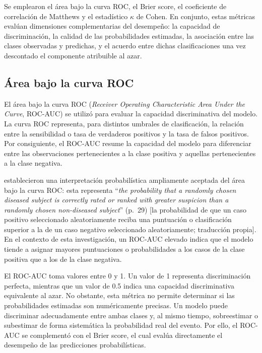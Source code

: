 Se emplearon el área bajo la curva ROC, el Brier score, el coeficiente de
correlación de Matthews y el estadístico $\kappa$ de Cohen. En conjunto, estas
métricas evalúan dimensiones complementarias del desempeño: la capacidad de
discriminación, la calidad de las probabilidades estimadas, la asociación entre las
clases observadas y predichas, y el acuerdo entre dichas clasificaciones una vez
descontado el componente atribuible al azar.

\subsection{Área bajo la curva ROC}

El área bajo la curva ROC (\emph{Receiver Operating Characteristic Area Under the
Curve}, ROC-AUC) se utilizó para evaluar la capacidad discriminativa del modelo. La
curva ROC representa, para distintos umbrales de clasificación, la relación entre
la sensibilidad o tasa de verdaderos positivos y la tasa de falsos positivos. Por
consiguiente, el ROC-AUC resume la capacidad del modelo para diferenciar entre las
observaciones pertenecientes a la clase positiva y aquellas pertenecientes a la
clase negativa.

 establecieron una interpretación probabilística
ampliamente aceptada del área bajo la curva ROC: esta representa ``\emph{the
probability that a randomly chosen diseased subject is correctly rated or ranked
with greater suspicion than a randomly chosen non-diseased subject}'' (p.~29) [la
probabilidad de que un caso positivo seleccionado aleatoriamente reciba una
puntuación o clasificación superior a la de un caso negativo seleccionado
aleatoriamente; traducción propia]. En el contexto de esta investigación, un
ROC-AUC elevado indica que el modelo tiende a asignar mayores puntuaciones o
probabilidades a los casos de la clase positiva que a los de la clase negativa.

El ROC-AUC toma valores entre 0 y 1. Un valor de 1 representa discriminación
perfecta, mientras que un valor de 0.5 indica una capacidad discriminativa
equivalente al azar. No obstante, esta métrica no permite determinar si las
probabilidades estimadas son numéricamente precisas. Un modelo puede discriminar
adecuadamente entre ambas clases y, al mismo tiempo, sobreestimar o subestimar de
forma sistemática la probabilidad real del evento. Por ello, el ROC-AUC se
complementó con el Brier score, el cual evalúa directamente el desempeño de las
predicciones probabilísticas.

